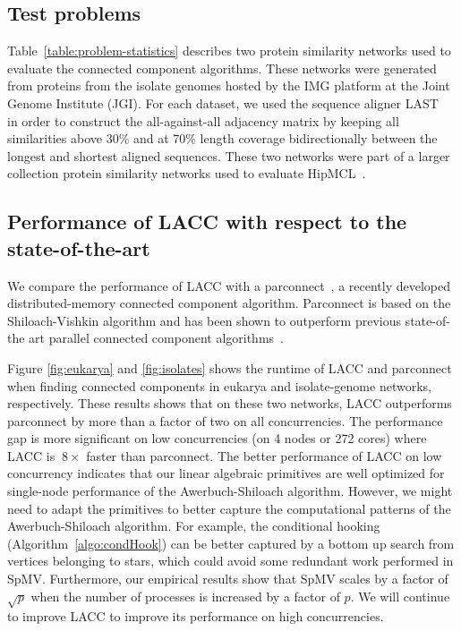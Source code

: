 \subsection{Test problems} 
Table~\ref{table:problem-statistics} describes two protein similarity networks used to evaluate the connected component algorithms.
These networks were generated from proteins from the isolate genomes hosted
by the IMG platform at the Joint Genome Institute (JGI). For each dataset, we used the sequence aligner LAST~\cite{kielbasa2011adaptive} in order to construct the all-against-all adjacency matrix
by keeping all similarities above 30\% and at 70\% length coverage bidirectionally between the longest and shortest aligned sequences. 
These two networks were part of a larger collection protein similarity networks  used to evaluate HipMCL~\cite{hipmcl}. 








\subsection{Performance of LACC with respect to the state-of-the-art}
We compare the performance of LACC with a parconnect~\cite{jain2017adaptive}, a recently developed distributed-memory connected component algorithm. 
Parconnect is based on the Shiloach-Vishkin algorithm and has been shown to outperform previous state-of-the art parallel connected component algorithms~\cite{slota2014bfs}.

Figure \ref{fig:eukarya} and \ref{fig:isolates} shows the runtime of LACC and parconnect when finding connected components in eukarya and isolate-genome networks, respectively.
These results shows that on these two networks, LACC outperforms parconnect by more than a factor of two on all concurrencies.
The performance gap is more significant on low concurrencies (on 4 nodes or 272 cores) where LACC is $~8\times$ faster than parconnect.
The better performance of LACC on low concurrency indicates that our linear algebraic primitives are well optimized for single-node performance of the Awerbuch-Shiloach algorithm.
However, we might need to adapt the primitives to better capture the computational patterns of the Awerbuch-Shiloach algorithm. 
For example, the conditional hooking (Algorithm~\ref{algo:condHook}) can be better captured by a bottom up search from vertices belonging to stars, which could avoid some redundant work performed in SpMV.
Furthermore, our empirical results show that SpMV scales by a factor of $\sqrt{p}$ when the number of processes is increased by a factor of $p$.
We will continue to improve LACC to improve its performance on high concurrencies. 



